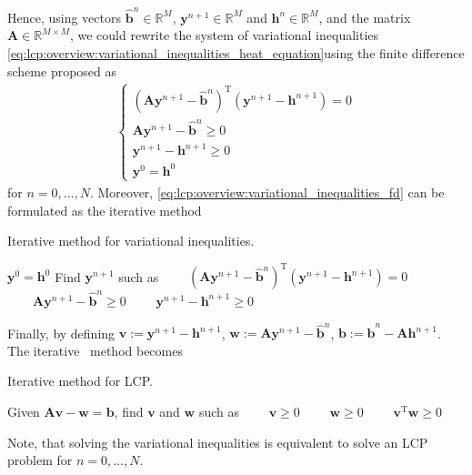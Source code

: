 Hence, using vectors $\hat{\mathbf{b}}^n\in\mathbb{R}^{M}$, $\mathbf{y}^{n+1}\in\mathbb{R}^{M}$ and $\mathbf{h}^n\in\mathbb{R}^{M}$, and the matrix $\mathbf{A}\in\mathbb{R}^{M \times M}$, we could rewrite the system of variational inequalities \eqref{eq:lcp:overview:variational_inequalities_heat_equation}using the finite difference scheme proposed as
\begin{align}
  \label{eq:lcp:overview:variational_inequalities_fd}
  \begin{cases}
    (\mathbf{A}\mathbf{y}^{n+1} - \hat{\mathbf{b}}^{n})^{\text{T}}(\mathbf{y}^{n+1}- \mathbf{h}^{n+1}) = 0\\
    \mathbf{A}\mathbf{y}^{n+1} - \hat{\mathbf{b}}^{n} \ge 0\\
    \mathbf{y}^{n+1}- \mathbf{h}^{n+1} \ge 0\\
    \mathbf{y}^{0} = \mathbf{h}^{0}
  \end{cases}
\end{align}
for $n=0,\dots,N$. Moreover, \eqref{eq:lcp:overview:variational_inequalities_fd} can be formulated as the iterative method
\begin{algorithm}[H]
  \caption{Iterative method for variational inequalities.}\label{alg:lcp:overview:variational_inequalities_iterative_method}
  \begin{algorithmic}
  \State $\mathbf{y}^{0} = \mathbf{h}^{0}$
  \State Find $\mathbf{y}^{n+1}$ such as 
  \State $\qquad (\mathbf{A}\mathbf{y}^{n+1} - \hat{\mathbf{b}}^{n})^{\text{T}}(\mathbf{y}^{n+1}- \mathbf{h}^{n+1}) = 0$
  \State $\qquad \mathbf{A}\mathbf{y}^{n+1} - \hat{\mathbf{b}}^{n} \ge 0$
  \State $\qquad \mathbf{y}^{n+1}- \mathbf{h}^{n+1} \ge 0$
  \EndFor
\end{algorithmic}
\end{algorithm}
\newpage
Finally, by defining $\mathbf{v} := \mathbf{y}^{n+1} - \mathbf{h}^{n+1}$,  $\mathbf{w} := \mathbf{A}\mathbf{y}^{n+1} - \hat{\mathbf{b}}^{n}$, $\mathbf{b} := \hat{\mathbf{b}}^n - \mathbf{A}\mathbf{h}^{n+1}$. The iterative \ method becomes
\begin{algorithm}[H]
  \caption{Iterative method for LCP.}\label{alg:lcp:overview:lcp_iterative_method}
  \begin{algorithmic}
  \State Given $\mathbf{A}\mathbf{v} - \mathbf{w} = \mathbf{b}$, find $\mathbf{v}$ and $\mathbf{w}$ such as 
  \State $\qquad \mathbf{v} \ge 0$
  \State $\qquad \mathbf{w} \ge 0$
  \State $\qquad \mathbf{v}^{\text{T}}\mathbf{w} \ge 0$
  \EndFor
\end{algorithmic}
\end{algorithm}
Note, that solving the variational inequalities is equivalent to solve an LCP problem for $n=0,\dots,N$.
